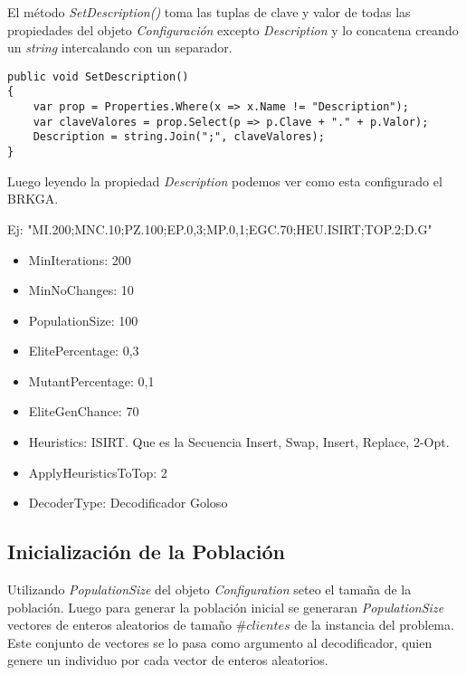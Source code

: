 \bigskip

El método \textit{SetDescription()} toma las tuplas de clave y valor de todas las propiedades del objeto \textit{Configuración} excepto \textit{Description} y lo concatena creando un \textit{string} intercalando con un separador.

\begin{minipage}{\textwidth}
\begin{lstlisting} 
public void SetDescription()
{ 
	var prop = Properties.Where(x => x.Name != "Description");
	var claveValores = prop.Select(p => p.Clave + "." + p.Valor);
	Description = string.Join(";", claveValores);
}
\end{lstlisting}
\end{minipage}


\begin{minipage}{\textwidth}
Luego leyendo la propiedad \textit{Description} podemos ver como esta configurado el BRKGA.

Ej: "MI.200;MNC.10;PZ.100;EP.0,3;MP.0,1;EGC.70;HEU.ISIRT;TOP.2;D.G"

\begin{itemize}
  \item MinIterations: 200
  \item MinNoChanges: 10
  \item PopulationSize: 100
  \item ElitePercentage: 0,3
  \item MutantPercentage: 0,1
  \item EliteGenChance: 70
  \item Heuristics: ISIRT. Que es la Secuencia Insert, Swap, Insert, Replace, 2-Opt.
  \item ApplyHeuristicsToTop: 2
  \item DecoderType: Decodificador Goloso
\end{itemize}
\end{minipage}

\subsection{Inicialización de la Población}

Utilizando \textit{PopulationSize} del objeto \textit{Configuration} seteo el tamaña de la población. Luego para generar la población inicial se generaran \textit{PopulationSize} vectores de enteros aleatorios de tamaño $\#clientes$ de la instancia del problema. Este conjunto de vectores se lo pasa como argumento al decodificador, quien genere un individuo por cada vector de enteros aleatorios.


